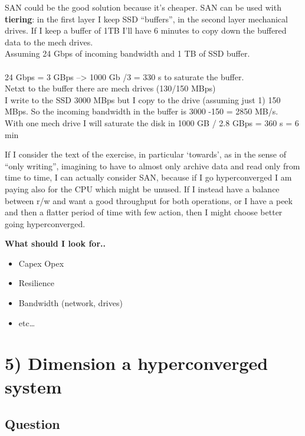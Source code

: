 SAN could be the good solution because it's cheaper. SAN can be used
with \textbf{tiering}: in the first layer I keep SSD ``buffers'', in the
second layer mechanical drives. If I keep a buffer of 1TB I'll have 6
minutes to copy down the buffered data to the mech drives.\\
Assuming 24 Gbps of incoming bandwidth and 1 TB of SSD buffer.\\
\\
24 Gbps = 3 GBps --\textgreater{} 1000 Gb /3 = 330 s to saturate the
buffer.\\
Netxt to the buffer there are mech drives (130/150 MBps)\\
I write to the SSD 3000 MBps but I copy to the drive (assuming just 1)
150 MBps. So the incoming bandwidth in the buffer is 3000 -150 = 2850
MB/s.\\
With one mech drive I will saturate the disk in 1000 GB / 2.8 GBps = 360
s = 6 min

If I consider the text of the exercise, in particular `towards', as in
the sense of ``only writing'', imagining to have to almost only archive
data and read only from time to time, I can actually consider SAN,
because if I go hyperconverged I am paying also for the CPU which might
be unused. If I instead have a balance between r/w and want a good
throughput for both operations, or I have a peek and then a flatter
period of time with few action, then I might choose better going
hyperconverged.

\textbf{What should I look for..}

\begin{itemize}
\item
  Capex Opex
\item
  Resilience
\item
  Bandwidth (network, drives)
\item
  etc\ldots{}
\end{itemize}

\hypertarget{dimension-a-hyperconverged-system}{%
\section{5) Dimension a hyperconverged
system}\label{dimension-a-hyperconverged-system}}

\hypertarget{question-4}{%
\subsection{Question}\label{question-4}}

